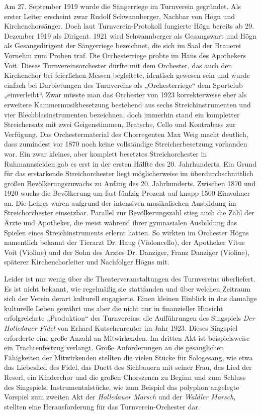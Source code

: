 \documentclass{book}
\begin{document}
Am 27. September 1919 wurde die Sängerriege im Turnverein gegründet. Als
erster Leiter erscheint zwar Rudolf Schwannberger, Nachbar von Högn und
Kirchenchorsänger. Doch laut Turnverein-Protokoll fungierte Högn
bereits ab 29. Dezember 1919 als Dirigent. 1921 wird Schwannberger
als Gesangswart und Högn als Gesangsdirigent der Sängerriege
bezeichnet, die sich im Saal der Brauerei Vornehm zum Proben traf. Die
Orchesterriege probte im Haus des Apothekers Voit. Dieses
Turnvereinsorchester dürfte mit dem Orchester, das auch den
Kirchenchor bei feierlichen Messen begleitete, identisch gewesen sein
und wurde einfach bei Darbietungen des Turnvereins als „Orchesterriege“
dem Sportclub „einverleibt“. Zwar müsste man das Orchester von 1923
korrekterweise eher als erweitere Kammermusikbesetzung bestehend aus
sechs Streichinstrumenten und vier Blechblasinstrumenten bezeichnen,
doch immerhin stand ein kompletter Streichersatz mit zwei
Geigenstimmen, Bratsche, Cello und Kontrabass zur Verfügung. Das
Orchestermaterial des Chorregenten Max Weig macht deutlich, dass
zumindest vor 1870 noch keine vollständige Streicherbesetzung vorhanden
war. Ein zwar kleines, aber komplett besetztes Streichorchester in
Ruhmannsfelden gab es erst in der ersten Hälfte des 20. Jahrhunderts.
Ein Grund für das erstarkende Streichorchester liegt möglicherweise
im überdurchschnittlich großen Bevölkerungszuwachs zu Anfang des 20.
Jahrhunderts. Zwischen 1870 und 1920 wuchs die Bevölkerung um fast
fünfzig Prozent auf knapp 1500 Einwohner an. Die Lehrer waren aufgrund
der intensiven musikalischen Ausbildung im Streichorchester
einsetzbar. Parallel zur Bevölkerungszahl stieg auch die Zahl der Ärzte
und Apotheker, die meist während ihrer gymnasialen Ausbildung das
Spielen eines Streichinstruments erlernt hatten. So wirkten im
Orchester Högns namentlich bekannt der Tierarzt Dr. Haug (Violoncello),
der Apotheker Vitus Voit (Violine) und der Sohn des Arztes Dr.
Danziger, Franz Danziger (Violine), späterer Kirchenchorleiter und
Nachfolger Högns mit.

Leider ist nur wenig über die Theaterveranstaltungen des Turnvereins
überliefert. Es ist nicht bekannt, wie regelmäßig sie stattfanden und
über welchen Zeitraum sich der Verein derart kulturell engagierte.
Einen kleinen Einblick in das damalige kulturelle Leben gewährt uns
aber die nicht nur in finanzieller Hinsicht erfolgreichste
„Produktion“ des Turnvereins: die Aufführungen des Singspiels
\textit{Der Holledauer Fidel} von Erhard Kutschenreuter im Jahr 1923.
Dieses Singspiel erforderte eine große Anzahl an Mitwirkenden. Im
dritten Akt ist beispielsweise ein Trachtenfestzug verlangt. Große
Anforderungen an die gesanglichen Fähigkeiten der Mitwirkenden
stellten die vielen Stücke für Sologesang, wie etwa das Liebeslied des
Fidel, das Duett des Sichbauern mit seiner Frau, das Lied der Reserl,
ein Kinderchor und die großen Chorszenen zu Beginn und zum Schluss des
Singspiels. Instrumentalstücke, wie zum Beispiel das polyphon angelegte
Vorspiel zum zweiten Akt der \textit{Holledauer Marsch} und der
\textit{Waldler Marsch}, stellten eine Herausforderung für das
Turnverein-Orchester dar.
\end{document}
